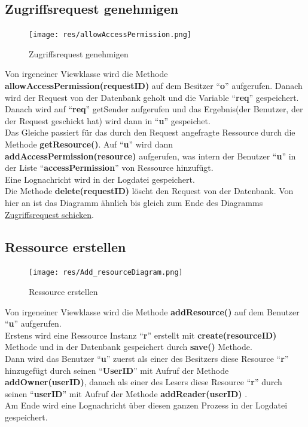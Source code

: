 \documentclass[parskip=full,11pt]{scrartcl}
\begin{document}
  \newpage
 \subsection{Zugriffsrequest genehmigen}
 \begin{figure}[ht!]
 	\centering
 	\texttt{[image: res/allowAccessPermission.png]}
 	\caption{Zugriffsrequest genehmigen}
 	 	\label{fig:allowAccPerm}
 \end{figure}
 
 Von irgeneiner Viewklasse wird die Methode \textbf{allowAccessPermission(requestID)} auf dem Besitzer \enquote{\textbf{o}}  aufgerufen. Danach wird der Request von der Datenbank geholt und die Variable \enquote{\textbf{req}} gespeichert.\\ Danach wird auf \enquote{\textbf{req}} getSender aufgerufen und das Ergebnis(der Benutzer, der der Request geschickt hat) wird dann in \enquote{\textbf{u}} gespeichet.\\ Das Gleiche passiert für das durch den Request angefragte Ressource durch die Methode \textbf{getResource()}. Auf \enquote{\textbf{u}} wird dann \textbf{addAccessPermission(resource)} aufgerufen, was intern der Benutzer \enquote{\textbf{u}} in der Liste \enquote{\textbf{accessPermission}} von Ressource hinzufügt.\\
Eine Lognachricht wird in der Logdatei gespeichert.\\ Die Methode \textbf{delete(requestID)} löscht den Request von der Datenbank. Von hier an ist das Diagramm ähnlich bis gleich zum Ende des Diagramms \hyperref[fig:sendAccReq]{Zugriffsrequest schicken}. 
 
  \newpage
 \subsection{Ressource erstellen}
 \begin{figure}[ht!]
 	\centering
 	\texttt{[image: res/Add\_resourceDiagram.png]}
 	\caption{Ressource erstellen}
 \end{figure}
 
Von irgeneiner Viewklasse wird die Methode \textbf{addResource()} auf dem Benutzer \enquote{\textbf{u}}  aufgerufen.\\ Erstens wird eine Ressource Instanz \enquote{\textbf{r}} erstellt mit \textbf{create(resourceID)} Methode und in der Datenbank gespeichert durch \textbf{save()} Methode.\\ Dann wird das Benutzer \enquote{\textbf{u}} zuerst als einer des Besitzers diese Resource \enquote{\textbf{r}} hinzugefügt durch seinen \enquote{\textbf{UserID}} mit Aufruf der Methode \textbf{addOwner(userID)}, danach als einer des Lesers diese Resource \enquote{\textbf{r}} durch seinen \enquote{\textbf{userID}} mit Aufruf der Methode \textbf{addReader(userID)} .\\Am Ende wird eine Lognachricht über diesen ganzen Prozess in der Logdatei gespeichert.
\end{document}
